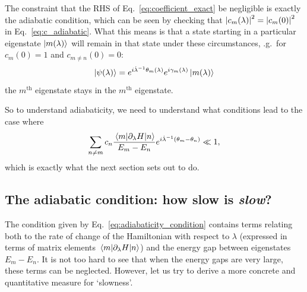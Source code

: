 \documentclass[a4paper,oneside,11pt]{book}
\newcommand{\dlambda}{\partial_{\lambda}}
\newcommand{\dotlambda}{\dot{\lambda}}
\begin{document}
    The constraint that the RHS of Eq.~\eqref{eq:coefficient_exact} be negligible is exactly the adiabatic condition, which can be seen by checking that $\abs{c_m(\lambda)}^2 = \abs{c_m(0)}^2$ in Eq.~\eqref{eq:c_adiabatic}. What this means is that a state starting in a particular eigenstate $\ket{m(\lambda)}$ will remain in that state under these circumstances, \@e.g.~for $c_m(0) = 1$ and $c_{m \neq n}(0) = 0$:
    \begin{equation}\label{eq:adiabatic_states}
        \ket{\psi(\lambda)} = e^{i \dotlambda^{-1} \theta_m(\lambda)}e^{i \gamma_m(\lambda)} \ket{m(\lambda)}
    \end{equation}
    the $m^{\text{th}}$ eigenstate stays in the $m^{\text{th}}$ eigenstate.

    So to understand adiabaticity, we need to understand what conditions lead to the case where
    \begin{equation}\label{eq:adiabaticity_condition}
        \sum_{n \neq m} c_n \frac{\mel{m}{\dlambda H}{n}}{E_m - E_n}e^{i \dotlambda^{-1} (\theta_m-\theta_n)} \ll 1,
    \end{equation}
    which is exactly what the next section sets out to do.

    \subsection{The adiabatic condition: how slow is \emph{slow}?}\label{sec:2.1.2_adiabatic_condition}

    The condition given by Eq.~\eqref{eq:adiabaticity_condition} contains terms relating both to the rate of change of the Hamiltonian with respect to $\lambda$ (expressed in terms of matrix elements $\mel{m}{\dlambda H}{n}$) and the energy gap between eigenstates $E_m - E_n$. It is not too hard to see that when the energy gaps are very large, these terms can be neglected. However, let us try to derive a more concrete and quantitative measure for `slowness'.
\end{document}

